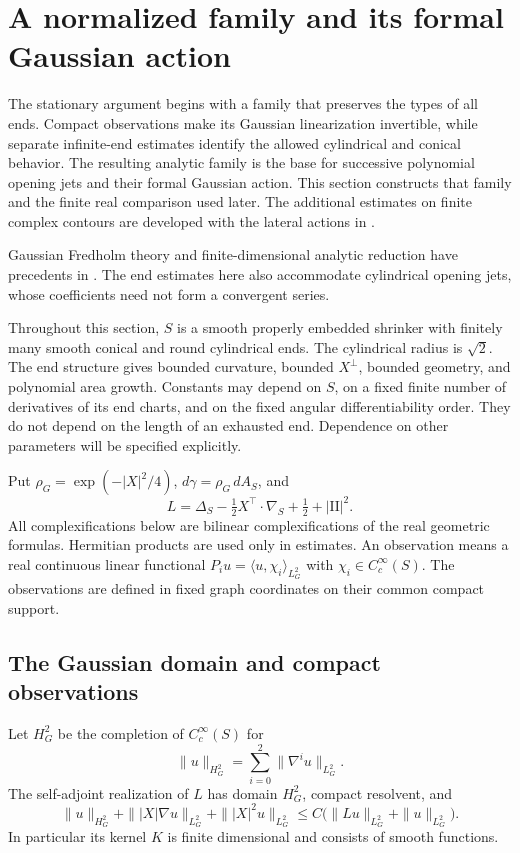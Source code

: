 \section{A normalized family and its formal Gaussian action}
\label{sec:linear}

The stationary argument begins with a family that preserves the types
of all ends.  Compact observations make its Gaussian linearization
invertible, while separate infinite-end estimates identify the allowed
cylindrical and conical behavior.  The resulting analytic family is the
base for successive polynomial opening jets and their formal Gaussian
action.  This section constructs that family and the finite real
comparison used later.  The additional estimates on finite complex
contours are developed with the lateral actions in .

Gaussian Fredholm theory and finite-dimensional analytic reduction
have precedents in \cite[Sections~3.4 and~4]{CS2021}.  The end estimates
here also accommodate cylindrical opening jets, whose coefficients need
not form a convergent series.

Throughout this section, $S$ is a smooth properly embedded shrinker with
finitely many smooth conical and round cylindrical ends.  The cylindrical
radius is $\sqrt2$.  The end structure gives bounded curvature, bounded
$X^\perp$, bounded geometry, and polynomial area growth.  Constants may
depend on $S$, on a fixed finite number of derivatives of its end charts,
and on the fixed angular differentiability order.  They do not depend on
the length of an exhausted end.  Dependence on other parameters will be
specified explicitly.

Put $\rho_G=\exp(-|X|^2/4)$, $d\gamma=\rho_G\,dA_S$, and
\[
 L=\Delta_S-\tfrac12X^\top\cdot\nabla_S+\tfrac12+|\mathrm{II}|^2.
\]
All complexifications below are bilinear complexifications of the real
geometric formulas.  Hermitian products are used only in estimates.
An observation means a real continuous linear functional
$P_i u=\langle u,\chi_i\rangle_{L^2_G}$ with
$\chi_i\in C_c^\infty(S)$.  The observations are defined in fixed graph
coordinates on their common compact support.

\subsection{The Gaussian domain and compact observations}

\begin{lemma}\label{lin:gaussian}
Let $H^2_G$ be the completion of $C_c^\infty(S)$ for
\[
 \|u\|_{H^2_G}=\sum_{i=0}^2\|\nabla^iu\|_{L^2_G}.
\]
The self-adjoint realization of $L$
has domain $H^2_G$, compact resolvent, and
\begin{equation}\label{lin:gaussian-estimate}
 \|u\|_{H^2_G}+\||X|\nabla u\|_{L^2_G}
       +\||X|^2u\|_{L^2_G}
 \le C\bigl(\|Lu\|_{L^2_G}+\|u\|_{L^2_G}\bigr).
\end{equation}
In particular its kernel $K$ is finite dimensional and consists of smooth
functions.
\end{lemma}

